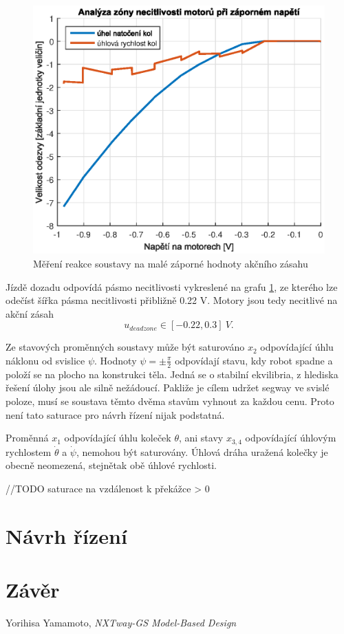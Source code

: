 \documentclass[conference]{IEEEtran}
\begin{document}
\begin{figure}[htbp]
    \centerline{\includegraphics[width=\linewidth]{deadzone_motory_vzad.eps}}
    \caption{Měření reakce soustavy na malé záporné hodnoty akčního zásahu}
    \label{fig:deadzone_vzad}        
\end{figure}

Jízdě dozadu odpovídá pásmo necitlivosti vykreslené na grafu \ref{fig:deadzone_vzad}, ze kterého
lze odečíst šířka pásma necitlivosti přibližně 0.22 \si{V}. Motory jsou tedy necitlivé
na akční zásah
\begin{equation}
    u_{deadzone} \in [-0.22, 0.3] ~\si{V}.
\end{equation}

Ze stavových proměnných soustavy může být saturováno $x_2$ odpovídající úhlu náklonu od svislice $\psi$.
Hodnoty $\psi = \pm \frac{\pi}{2}$ odpovídají stavu, kdy robot spadne a položí se na plocho na konstrukci těla.
Jedná se o stabilní ekvilibria, z hlediska řešení úlohy jsou ale silně nežádoucí. Pakliže je cílem udržet segway ve svislé poloze,
musí se soustava těmto dvěma stavům vyhnout za každou cenu. Proto není tato saturace pro návrh řízení nijak podstatná.

Proměnná $x_1$ odpovídající úhlu koleček $\theta$, ani stavy $x_{3,4}$ odpovídající úhlovým rychlostem $\dot{\theta}$ a $\dot{\psi}$,
nemohou být saturovány. Úhlová dráha uražená kolečky je obecně neomezená, stejnětak obě úhlové rychlosti.

//TODO saturace na vzdálenost k překážce > 0

\section{Návrh řízení}

\section{Závěr}

\begin{thebibliography}{9}

    Yorihisa Yamamoto, \emph{NXTway-GS Model-Based Design} 
    \end{thebibliography}
\end{document}
